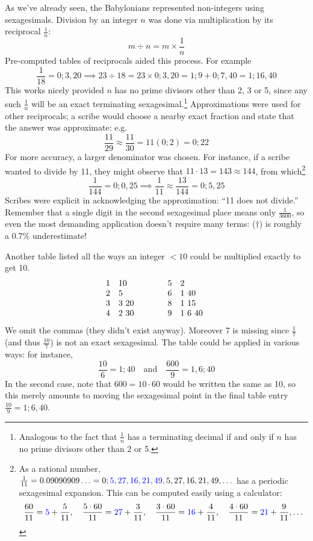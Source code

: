 As we've already seen, the Babylonians represented non-integers using sexagesimals. Division by an integer $n$ was done via multiplication by its reciprocal $\frac 1n$:
\[
	m\div n=m\times \frac 1n
\]
Pre-computed tables of reciprocals aided this process. For example
\[
	\frac 1{18}=0;3,20 \implies 23\div 18=23\times 0;3,20 =1;9+0;7,40 =1;16,40
\]
This works nicely provided $n$ has no prime divisors other than 2, 3 or 5, since any such $\frac 1n$ will be an exact terminating sexagesimal.\footnote{%
	Analogous to the fact that $\frac 1n$ has a terminating decimal if and only if $n$ has no prime divisors other than 2 or 5.%
}
Approximations were used for other reciprocals; a scribe would choose a nearby exact fraction and state that the answer was approximate: e.g.
\[
	\frac{11}{29}\approx\frac{11}{30}=11(0;2)=0;22
\]
For more accuracy, a larger denominator was chosen. For instance, if a scribe wanted to divide by 11, they might observe that $11\cdot 13=143\approx 144$, from which\footnote{%
	As a rational number, $\frac 1{11}=0.09090909\ldots=0;\textcolor{blue}{5,27,16,21,49,\,}5,27,16,21,49,\ldots$ has a periodic sexagesimal expansion. This can be computed easily using a calculator:
	\[
		\frac{60}{11}=\textcolor{blue}{5}+\frac 5{11},\quad 
		\frac{5\cdot 60}{11}=\textcolor{blue}{27}+\frac 3{11},\quad 
		\frac{3\cdot 60}{11}=\textcolor{blue}{16}+\frac{4}{11},\quad 
		\frac{4\cdot 60}{11}=\textcolor{blue}{21}+\frac{9}{11},\ldots
	\]%
}
\[
	\frac 1{144}=0;0,25\implies \frac 1{11}\approx\frac{13}{144}=0;5,25 \tag{$\dag$}
\]
Scribes were explicit in acknowledging the approximation: ``11 does not divide.'' Remember that a single digit in the second sexagesimal place means only $\frac 1{3600}$, so even the most demanding application doesn't require many terms: ($\dag$) is roughly a 0.7\%{} underestimate!  %
\medbreak


Another table listed all the ways an integer $<10$ could be multiplied exactly to get 10.
\[
	\begin{array}{@{}cl@{\qquad\qquad}cl}
		1&10&5&2\\
		2&5&6&1\ 40\\
		3&3\ 20&8&1\ 15\\
		4&2\ 30&9&1\ 6\ 40
\end{array}
\]
We omit the commas (they didn't exist anyway). Moreover 7 is missing since $\frac 17$ (and thus $\frac{10}7$) is not an exact sexagesimal. The table could be applied in various ways: for instance,
\[
	\frac{10}6=1;40\quad\text{and}\quad \frac{600}9=1,6;40
\]
In the second case, note that $600=10\cdot 60$ would be written the same as 10, so this merely amounts to moving the sexagesimal point in the final table entry $\frac{10}9=1;6,40$.



